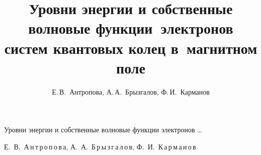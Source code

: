 
%


%



\renewcommand{\firstpage}{326}

\renewcommand{\lastpage}{333}





\newcommand{\antropovaDiff}[2]{\frac{d}{d#2}#1}                         %

\newcommand{\antropovaDiffn}[3]{\frac{d^#3}{d^#3#2}#1}                  %

\newcommand{\antropovaDiffp}[2]{\frac{\partial}{\partial#2}#1}          %

\newcommand{\antropovaDiffpn}[3]{\frac{\partial^#3}{\partial^#3#2}#1}   %










\title{Уровни энергии и собственные волновые функции~электронов систем квантовых колец в~магнитном поле}%

{Уровни энергии и собственные волновые функции электронов \dots}%



\author{Е.\,В.~Антропова, А.\,А.~Брызгалов, Ф.\,И.~Карманов}%

{Е.~В.~А\,н\,т\,р\,о\,п\,о\,в\,а, А.~А.~Б\,р\,ы\,з\,г\,а\,л\,о\,в, Ф.~И.~К\,а\,р\,м\,а\,н\,о\,в}%











